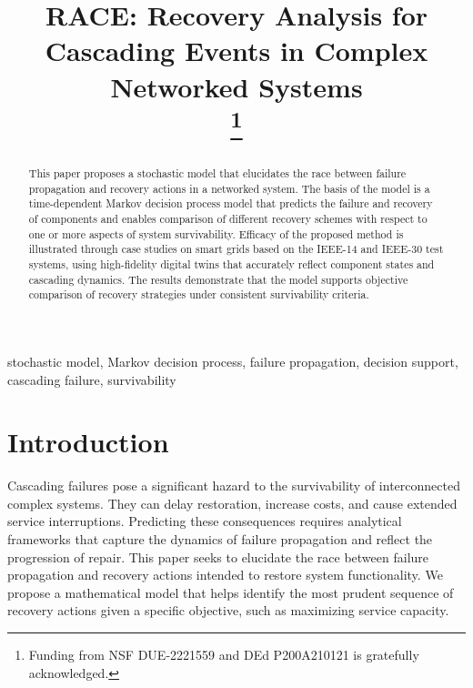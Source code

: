 \documentclass[conference]{IEEEtran}
\begin{document}
%

\title{RACE: Recovery Analysis for Cascading Events in Complex Networked Systems\\\noindent \thanks{\hspace{-1em}Funding from NSF DUE-2221559 and DEd P200A210121 is gratefully acknowledged.}}



%


\author{
}

\maketitle              %
%
\begin{abstract}
This paper proposes a stochastic model that elucidates the race between failure propagation and recovery actions in a networked system. The basis of the model is a time-dependent Markov decision process model that predicts the failure and recovery of components and enables comparison of different recovery schemes with respect to one or more aspects of system survivability. 
Efficacy of the proposed method is illustrated through case studies on smart grids based on the IEEE-14 and IEEE-30 test systems, using high-fidelity digital twins that accurately reflect component states and cascading dynamics. The results demonstrate that the model supports objective comparison of recovery strategies under consistent survivability criteria.
\end{abstract}

\begin{IEEEkeywords}
stochastic model, Markov decision process, failure propagation, decision support, cascading failure, survivability
\end{IEEEkeywords}

\section{Introduction}\label{sec:intro}
Cascading failures pose a significant hazard to the survivability of interconnected complex systems. They can delay restoration, increase costs, and cause extended service interruptions. Predicting these consequences requires analytical frameworks that capture the dynamics of failure propagation and reflect the progression of repair. This paper seeks to elucidate the race between failure propagation and recovery actions intended to restore system functionality. We propose a mathematical model that helps identify the most prudent sequence of recovery actions given a specific objective, such as maximizing service capacity.
\end{document}
